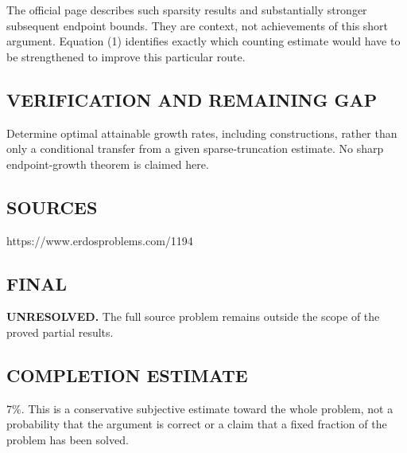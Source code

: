 The official page describes such sparsity results and substantially stronger
subsequent endpoint bounds. They are context, not achievements of this short
argument. Equation (1) identifies exactly which counting estimate would have
to be strengthened to improve this particular route.

\subsection*{VERIFICATION AND REMAINING GAP}
Determine optimal attainable growth rates, including constructions, rather
than only a conditional transfer from a given sparse-truncation estimate.
No sharp endpoint-growth theorem is claimed here.

\subsection*{SOURCES}
https://www.erdosproblems.com/1194

\subsection*{FINAL}
\textbf{UNRESOLVED.} The full source problem remains outside the scope of the proved partial results.

\subsection*{COMPLETION ESTIMATE}
$7\%$. This is a conservative subjective estimate toward the whole problem, not a probability that the argument is correct or a claim that a fixed fraction of the problem has been solved.
